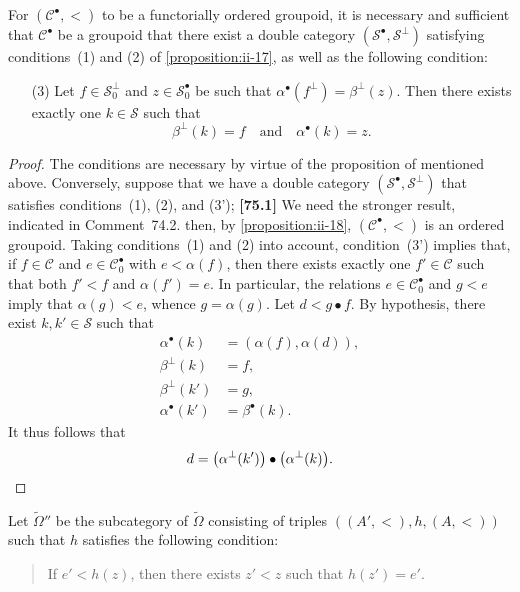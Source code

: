 \documentclass[a4paper,fleqn]{article}
\theoremstyle{plain}
\newenvironment{proposition}[1]
  {\renewcommand\theinnerproposition{#1}\innerproposition}
  {\endinnerproposition}
\theoremstyle{definition}
\newenvironment{longcomm}[1]
  {\noindent\textbf{[#1]}\rmfamily}
  {}
\newcommand{\oldpage}[1]{{\marginpar{\footnotesize$\bigg\vert$\,\,\,\,\textit{p.~#1}}}}
\newcommand{\textand}{\quad\text{and}\quad}
\newcommand{\CC}{\mathcal{C}}
\renewcommand{\SS}{\mathcal{S}}
\begin{document}
\begin{proposition}{20}
\label{proposition:ii-20}
  For $(\CC^\bullet,<)$ to be a functorially ordered groupoid, it is necessary and sufficient that $\CC^\bullet$ be a groupoid that there exist a double category $(\SS^\bullet,\SS^\perp)$ satisfying conditions~(1) and (2) of \cref{proposition:ii-17}, as well as the following condition:
  \begin{enumerate}
    \item[\normalfont(3\textquotesingle)]
      Let $f\in\SS_0^\perp$ and $z\in\SS_0^\bullet$ be such that $\alpha^\bullet(f^\perp)=\beta^\perp(z)$.
      Then there exists exactly one $k\in\SS$ such that
      \[
        \beta^\perp(k)=f
        \textand
        \alpha^\bullet(k)=z.
      \]
  \end{enumerate}
\end{proposition}

\begin{proof}
  \oldpage{403}
  The conditions are necessary by virtue of the proposition of \cite{3a} mentioned above.
  Conversely, suppose that we have a double category $(\SS^\bullet,\SS^\perp)$ that satisfies conditions~(1), (2), and (3');
  \begin{longcomm}{75.1}
    We need the stronger result, indicated in Comment~74.2.
  \end{longcomm}
  then, by \cref{proposition:ii-18}, $(\CC^\bullet,<)$ is an ordered groupoid.
  Taking conditions~(1) and (2) into account, condition~(3') implies that, if $f\in\CC$ and $e\in\CC_0^\bullet$ with $e<\alpha(f)$, then there exists exactly one $f'\in\CC$ such that both $f'<f$ and $\alpha(f')=e$.
  In particular, the relations $e\in\CC_0^\bullet$ and $g<e$ imply that $\alpha(g)<e$, whence $g=\alpha(g)$.
  Let $d<g\bullet f$.
  By hypothesis, there exist $k,k'\in\SS$ such that
  \[
    \begin{aligned}
      \alpha^\bullet(k)
      &=(\alpha(f),\alpha(d)),
    \\\beta^\perp(k)
      &=f,
    \\\beta^\perp(k')
      &=g,
    \\\alpha^\bullet(k')
      &=\beta^\bullet(k).
    \end{aligned}
  \]
  It thus follows that
  \[
    d = \big(\alpha^\perp(k')\big)\bullet\big(\alpha^\perp(k)\big).
    \qedhere
  \]
\end{proof}

Let $\widetilde{\Omega}''$ be the subcategory of $\widetilde{\Omega}$ consisting of triples $((A',<),h,(A,<))$ such that $h$ satisfies the following condition:
\begin{quote}
  If $e'<h(z)$, then there exists $z'<z$ such that $h(z')=e'$.
\end{quote}
\end{document}
